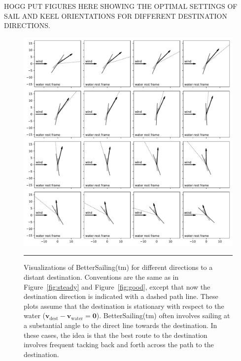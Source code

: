 \documentclass[letterpaper]{article}
\renewcommand{\vec}[1]{\boldsymbol{#1}}
\newcommand{\water}{\text{water}}
\newcommand{\destination}{\text{dest}}
\newcommand{\vwater}{\vec{v}_\water}
\newcommand{\vdest}{\vec{v}_\destination}
\newcommand{\figref}[1]{Figure~\ref{#1}}
\newcommand{\figurerule}{\rule[1ex]{\textwidth}{0.2pt}}
\begin{document}
HOGG PUT FIGURES HERE SHOWING THE OPTIMAL SETTINGS OF SAIL AND KEEL ORIENTATIONS FOR DIFFERENT DESTINATION DIRECTIONS.
\begin{figure}[t!]
  \includegraphics[width=\textwidth]{better.pdf}
  \caption{Visualizations of BetterSailing(tm) for different directions to a distant destination.
  Conventions are the same as in \figref{fig:steady} and \figref{fig:good}, except that now the destination direction is indicated with a dashed path line.
  These plots assume that the destination is stationary with respect to the water ($\vdest-\vwater=\vec{0}$).
  BetterSailing(tm) often involves sailing at a substantial angle to the direct line towards the destination.
  In these cases, the idea is that the best route to the destination involves frequent tacking back and forth across the path to the destination.\label{fig:better}}
  \figurerule
\end{figure}
\end{document}
